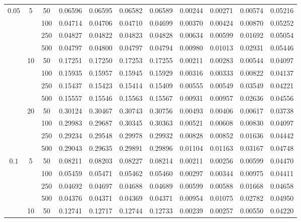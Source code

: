 \documentclass[10pt]{article}
\begin{document}
\begin{center}
\begin{longtable}{ccccccccccc}
		\multirow{12}{*}{$0.05$}
		& \multirow{4}{*}{5}&50 & 0.06596 & 0.06595 & 0.06582 & 0.06589 & 0.00244 & 0.00271 & 0.00574 & 0.05216 \\ \cline{3-11} 
		&&100 & 0.04714 & 0.04706 & 0.04710 & 0.04699 & 0.00370 & 0.00424 & 0.00870 & 0.05252 \\ \cline{3-11} 
		&&250 & 0.04827 & 0.04822 & 0.04823 & 0.04828 & 0.00634 & 0.00599 & 0.01692 & 0.05054 \\ \cline{3-11} 
		&&500 & 0.04797 & 0.04800 & 0.04797 & 0.04794 & 0.00980 & 0.01013 & 0.02931 & 0.05446 \\ \cline{2-11} 
		& \multirow{4}{*}{10}&50 & 0.17251 & 0.17250 & 0.17253 & 0.17255 & 0.00211 & 0.00283 & 0.00544 & 0.04097 \\ \cline{3-11} 
		&&100 & 0.15935 & 0.15957 & 0.15945 & 0.15929 & 0.00316 & 0.00333 & 0.00822 & 0.04137 \\ \cline{3-11} 
		&&250 & 0.15437 & 0.15423 & 0.15414 & 0.15409 & 0.00555 & 0.00549 & 0.03549 & 0.04221 \\ \cline{3-11} 
		&&500 & 0.15557 & 0.15546 & 0.15563 & 0.15567 & 0.00931 & 0.00957 & 0.02636 & 0.04556 \\ \cline{2-11} 
		& \multirow{4}{*}{20}&50 &    0.30124 &    0.30467 & 0.30743 & 0.30756 & 0.00493 & 0.00406 & 0.00617 & 0.03738 \\ \cline{3-11} 
		&&100 &    0.29983 &  0.29687 & 0.30345 & 0.30363 & 0.00521 & 0.00608 & 0.00830 & 0.04097 \\ \cline{3-11} 
		&&250 &    0.29234 &  0.29548 & 0.29978 & 0.29932 & 0.00828 & 0.00852 & 0.01636 & 0.04442 \\ \cline{3-11} 
		&&500 &    0.29043 &  0.29635 & 0.29891 & 0.29896 & 0.01104 & 0.01163 & 0.03167 & 0.04748 \\ \hline 
		\multirow{12}{*}{$0.1$}
		& \multirow{4}{*}{5}&50 & 0.08211 & 0.08203 & 0.08227 & 0.08214 & 0.00211 & 0.00256 & 0.00599 & 0.04470 \\ \cline{3-11}
		&&100 & 0.05459 & 0.05471 & 0.05462 & 0.05460 & 0.00297 & 0.00344 & 0.00975 & 0.04411 \\ \cline{3-11}
		&&250 & 0.04692 & 0.04697 & 0.04688 & 0.04689 & 0.00599 & 0.00588 & 0.01668 & 0.04658 \\ \cline{3-11}
		&&500 & 0.04376 & 0.04371 & 0.04369 & 0.04371 & 0.00954 & 0.01075 & 0.02782 & 0.04950 \\ \cline{2-11}
		& \multirow{4}{*}{10}&50& 0.12741 & 0.12717 & 0.12744 & 0.12733 & 0.00239 & 0.00257 & 0.00550 & 0.04220 \\ \cline{3-11}

\end{longtable}
\end{center}
\end{document}
